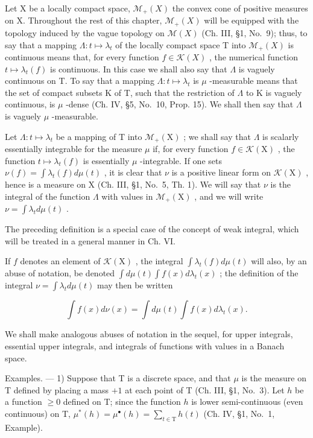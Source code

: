 Let X be a locally compact space, \(\mathcal{M}_{+}(X)\) the convex cone of positive measures on X. Throughout the rest of this chapter, \(\mathcal{M}_{+}(X)\) will be equipped with the topology induced by the vague topology on \(\mathcal{M}(X)\) (Ch. III, §1, No.~9); thus, to say that a mapping \(\Lambda: t \mapsto \lambda_{t}\) of the locally compact space T into \(\mathcal{M}_{+}(X)\) is continuous means that, for every function \(f \in \mathcal{K}(X)\) , the numerical function \(t \mapsto \lambda_{t}(f)\) is continuous. In this case we shall also say that \(\Lambda\) is vaguely continuous on T. To say that a mapping \(\Lambda: t \mapsto \lambda_{t}\) is \(\mu\) -measurable means that the set of compact subsets K of T, such that the restriction of \(\Lambda\) to K is vaguely continuous, is \(\mu\) -dense (Ch. IV, §5, No.~10, Prop. 15). We shall then say that \(\Lambda\) is vaguely \(\mu\) -measurable.

Let \(\Lambda : t \mapsto \lambda_t\) be a mapping of T into \(\mathcal{M}_+(\mathrm{X})\) ; we shall say that \(\Lambda\) is scalarly essentially integrable for the measure \(\mu\) if, for every function \(f \in \mathcal{K}(\mathrm{X})\) , the function \(t \mapsto \lambda_t(f)\) is essentially \(\mu\) -integrable. If one sets \(\nu(f) = \int \lambda_t(f) d\mu(t)\) , it is clear that \(\nu\) is a positive linear form on \(\mathcal{K}(\mathrm{X})\) , hence is a measure on X (Ch. III, §1, No.~5, Th. 1). We will say that \(\nu\) is the integral of the function \(\Lambda\) with values in \(\mathcal{M}_+(\mathrm{X})\) , and we will write \(\nu = \int \lambda_t d\mu(t)\) .

The preceding definition is a special case of the concept of weak integral, which will be treated in a general manner in Ch. VI.

If \(f\) denotes an element of \(\mathcal{K}(\mathrm{X})\) , the integral \(\int \lambda_t(f) d\mu(t)\) will also, by an abuse of notation, be denoted \(\int d\mu(t) \int f(x) d\lambda_t(x)\) ; the definition of the integral \(\nu = \int \lambda_t d\mu(t)\) may then be written

\[
\int f (x) d \nu (x) = \int d \mu (t) \int f (x) d \lambda_ {t} (x).\tag{1}
\]

We shall make analogous abuses of notation in the sequel, for upper integrals, essential upper integrals, and integrals of functions with values in a Banach space.

Examples. --- 1) Suppose that T is a discrete space, and that \(\mu\) is the measure on T defined by placing a mass \(+1\) at each point of T (Ch. III, §1, No.~3). Let \(h\) be a function \(\geqslant 0\) defined on T; since the function \(h\) is lower semi-continuous (even continuous) on T, \(\mu^{*}(h) = \mu^{\bullet}(h) = \sum_{t\in \mathrm{T}}h(t)\) (Ch. IV, §1, No.~1, Example).

